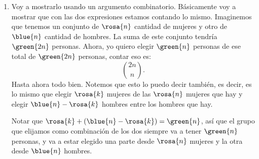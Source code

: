 \begin{enumerate}[label=\roman*)]
  \item
        Voy a mostrarlo usando un argumento combinatorio. Básicamente voy a mostrar que con las dos expresiones estamos contando lo mismo.
        Imaginemos que tenemos un conjunto de $\rosa{n}$ cantidad de mujeres y otro de $\blue{n}$ cantidad de hombres.
        La suma de este conjunto tendría $\green{2n}$ personas. Ahora, yo quiero elegir $\green{n}$ personas de ese total
        de $\green{2n}$ personas, contar eso es:
        $$
          \binom{2n}{n}.
        $$
        Hasta ahora todo bien. Notemos que esto lo puedo decir también, es decir, es lo mismo que elegir
        $\rosa{k}$ mujeres de las $\rosa{n}$ mujeres que hay y elegir $\blue{n} - \rosa{k}$ hombres entre los  hombres que hay.

        Notar que $\rosa{k} + (\blue{n} - \rosa{k}) = \green{n}$, así que el grupo que elijamos como combinación
        de los dos siempre va a tener $\green{n}$ personas, y va a estar elegido una parte desde $\rosa{n}$ mujeres y la otra desde $\blue{n}$ hombres.

        \medskip


\end{enumerate}
